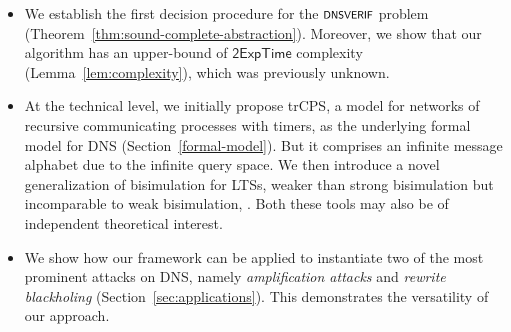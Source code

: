 \begin{itemize}
    \item We establish the first decision procedure for the $\scrsf{dnsverif}$ problem (Theorem~\ref{thm:sound-complete-abstraction}). Moreover, we show that our algorithm has an upper-bound of $\mathsf{2ExpTime}$ complexity (Lemma~\ref{lem:complexity}), which was previously unknown. %

    \item At the technical level, we initially propose trCPS, a model for networks of recursive communicating processes with timers, as the underlying formal model for DNS (Section~\ref{formal-model}). But it comprises an infinite message alphabet due to the infinite query space.  We then introduce a novel generalization of bisimulation for LTSs, weaker than strong bisimulation \cite{milner1980calculus} but incomparable to weak bisimulation, . Both these tools may also be of independent theoretical interest.
    \item We show how our framework can be applied to instantiate two of the most prominent attacks on DNS, namely \emph{amplification attacks} and \emph{rewrite blackholing} (Section~\ref{sec:applications}). This demonstrates the versatility of our approach. %
\end{itemize}













